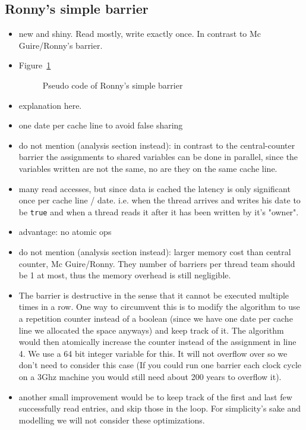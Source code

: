 \documentclass[a4paper, 10pt]{article}
\begin{document}
\subsection{Ronny's simple barrier}
\begin{itemize}
	\item new and shiny. Read mostly, write exactly once. In contrast to Mc Guire/Ronny's barrier.
	\item Figure~\ref{fig:ronny-simple-no-reset}
		\begin{figure}[htbp]
			\centering
			
			\caption{Pseudo code of Ronny's simple barrier}
			\label{fig:ronny-simple-no-reset}
		\end{figure}
	\item explanation here.
	\item one date per cache line to avoid false sharing\cite{falsesharing}
	\item do not mention (analysis section instead): in contrast to the central-counter barrier the assignments to shared variables can be done in parallel, since the variables written are not the same, no are they on the same cache line.
	\item many read accesses, but since data is cached the latency is only significant once per cache line / date. i.e. when the thread arrives and writes his date to be \texttt{true} and when a thread reads it after it has been written by it's "owner".
	\item advantage: no atomic ops
	\item do not mention (analysis section instead): larger memory cost than central counter, Mc Guire/Ronny. They number of barriers per thread team should be 1 at most, thus the memory overhead is still negligible.
	\item The barrier is destructive in the sense that it cannot be executed multiple times in a row. One way to circumvent this is to modify the algorithm to use a repetition counter instead of a boolean (since we have one date per cache line we allocated the space anyways) and keep track of it. The algorithm would then atomically increase the counter instead of the assignment in line 4. We use a 64 bit integer variable for this. It will not overflow over so we don't need to consider this case (If you could run one barrier each clock cycle on a 3Ghz machine you would still need about 200 years to overflow it).
	\item another small improvement would be to keep track of the first and last few successfully read entries, and skip those in the loop. For simplicity's sake and modelling we will not consider these optimizations.
\end{itemize}
\end{document}
